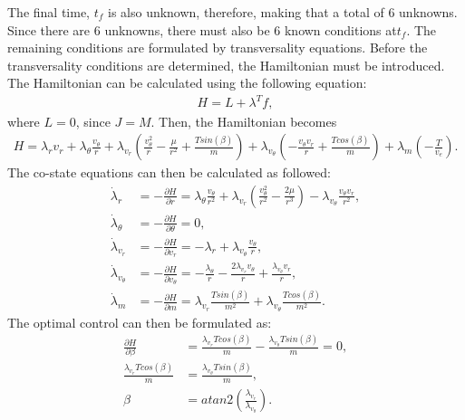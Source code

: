 \documentclass[]{article}
\begin{document}
The final time, \(t_f\) is also unknown, therefore, making that a total of 6 unknowns. Since there are 6 unknowns, there must also be 6 known conditions at\(t_f\). The remaining conditions are formulated by transversality equations. Before the transversality conditions are determined, the Hamiltonian must be introduced. The Hamiltonian can be calculated using the following equation:
\begin{align}
	H = L + \lambda^{T}f,
\end{align}
where \(L = 0\), since \(J = M\). Then, the Hamiltonian becomes
\begin{align*}
	H = \lambda_{r}v_r + \lambda_{\theta}\frac{v_\theta}{r} + \lambda_{v_r}(\frac{v^2_{\theta}}{r} - \frac{\mu}{r^2} + \frac{Tsin(\beta)}{m}) + \lambda_{v_\theta}(-\frac{v_{\theta}v_{r}}{r}   + \frac{Tcos(\beta)}{m}) +\lambda_m(-\frac{T}{v_e}).
\end{align*}
The co-state equations can then be calculated as followed:
\begin{align}
	\dot{\lambda}_r      &= -\frac{\partial{H}}{\partial{r}} = \lambda_\theta\frac{v_\theta}{r^2} + \lambda_{v_r}(\frac{v_{\theta}^2}{r^2} - \frac{2\mu}{r^3})-\lambda_{v_\theta}\frac{v_{\theta}v_r}{r^2}, \label{lamdotr} \\
	\dot{\lambda}_\theta &= -\frac{\partial{H}}{\partial{\theta}} = 0,                                                                                                     \label{lamdottheta} \\
	\dot{\lambda}_{v_r}  &=  -\frac{\partial{H}}{\partial{v_r}} = -\lambda_r + \lambda_{v_\theta}\frac{v_\theta}{r},                                                       \label{lamdotvr}    \\
	\dot{\lambda}_{v_\theta} &=  -\frac{\partial{H}}{\partial{v_\theta}} = -\frac{\lambda_\theta}{r} - \frac{2\lambda_{v_r}v_\theta}{r} + \frac{\lambda_{v_\theta}v_r}{r}, \label{lamdotvtheta}\\
    \dot{\lambda}_m          &=  -\frac{\partial{H}}{\partial{m}} = \lambda_{v_r}\frac{Tsin(\beta)}{m^2} + \lambda_{v_\theta}\frac{Tcos(\beta)}{m^2}.                      \label{lamdotm}
\end{align}
The optimal control can then be formulated as:
\begin{align}
	\frac{\partial H}{\partial \beta} &= \frac{\lambda_{v_r}Tcos(\beta)}{m} - \frac{\lambda_{v_\theta}Tsin(\beta)}{m} = 0, \nonumber\\
	\frac{\lambda_{v_r}Tcos(\beta)}{m} &= \frac{\lambda_{v_\theta}Tsin(\beta)}{m}, \nonumber\\
	\beta &= atan2(\frac{\lambda_{v_r}}{\lambda_{v_\theta}}) \label{control}.
\end{align}
\end{document}
